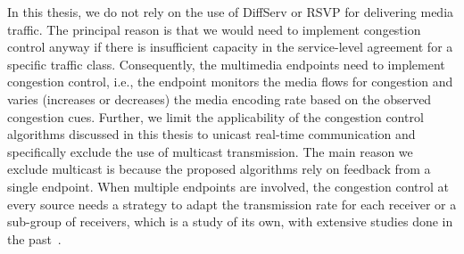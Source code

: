 





In this thesis, we do not rely on the use of DiffServ or RSVP for delivering
media traffic. The principal reason is that we would need to implement
congestion control anyway if there is insufficient capacity in the service-level
agreement for a specific traffic class. Consequently, the multimedia
endpoints need to implement congestion control, i.e., the endpoint monitors
the media flows for congestion and varies (increases or decreases) the media
encoding rate based on the observed congestion cues. Further, we limit the
applicability of the congestion control algorithms discussed in this thesis to
unicast real-time communication and specifically exclude the use of multicast
transmission. The main reason we exclude multicast is because the proposed
algorithms rely on feedback from a single endpoint. When multiple endpoints
are involved, the congestion control at every source needs a strategy to adapt
the transmission rate for each receiver or a sub-group of receivers, which is
a study of its own, with extensive studies done in the past~\cite{vicisano1998tcp,
widmer2001extending, rizzo2000pgmcc, golestani1999fundamental}.

